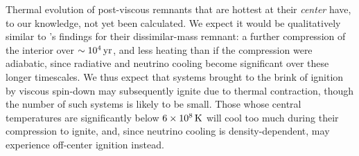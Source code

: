 Thermal evolution of post-viscous remnants that are hottest at their \textit{center} have, to our knowledge, not yet been calculated.  We expect it would be qualitatively similar to \cite{shen+12}'s findings for their dissimilar-mass remnant: a further compression of the interior over $\sim10^4\,\mathrm{yr}$, and less heating than if the compression were adiabatic, since radiative and neutrino cooling become significant over these longer timescales.  We thus expect that systems brought to the brink of ignition by viscous spin-down may subsequently ignite due to thermal contraction, though the number of such systems is likely to be small.  Those whose central temperatures are significantly below $6\times10^8\,\mathrm{K}$ will cool too much during their compression to ignite, and, since neutrino cooling is density-dependent, may experience off-center ignition instead.
